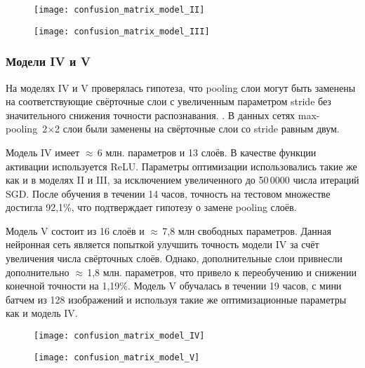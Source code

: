 \begin{figure}[H]
\centering
\begin{minipage}{.5\textwidth}
  \centering
  \texttt{[image: confusion\_matrix\_model\_II]}
  \vspace*{-1.7cm}
\end{minipage}%
\begin{minipage}{.5\textwidth}
  \centering
  \texttt{[image: confusion\_matrix\_model\_III]}
  \vspace*{-1.7cm}
\end{minipage}
\end{figure}

\subsubsection{Модели IV и V}
На моделях IV и V проверялась гипотеза, что pooling слои могут быть заменены на соответствующие свёрточные слои
с увеличенным параметром stride без значительного снижения точности распознавания. \cite{DBLP:journals/corr/SpringenbergDBR14}.
В данных сетях max-pooling~2$\times$2 слои были заменены  на свёрточные слои со stride равным двум.

Модель IV имеет $\approx$\,6 млн. параметров и 13 слоёв. В качестве функции активации используется ReLU.
Параметры оптимизации использовались такие же как и в моделях II и III, за исключением увеличенного
до 50\,0000 числа итераций SGD. После обучения в течении 14 часов, точность на тестовом множестве достигла 92,1\%, что
подтверждает гипотезу о замене pooling слоёв.

Модель V состоит из 16 слоёв и $\approx$\,7,8 млн свободных параметров. Данная нейронная сеть является попыткой
улучшить точность модели IV за счёт увеличения числа свёрточных слоёв. Однако, дополнительные слои привнесли
дополнительно $\approx$\,1,8 млн. параметров, что привело к переобучению и снижении конечной точности на 1,19\%.
Модель V обучалась в течении 19 часов, с мини батчем из 128 изображений и используя такие же оптимизационные параметры
как и модель IV.

\begin{figure}[H]
\centering
\begin{minipage}{.5\textwidth}
  \centering
  \texttt{[image: confusion\_matrix\_model\_IV]}
  \vspace*{-1.7cm}
\end{minipage}%
\begin{minipage}{.5\textwidth}
  \centering
  \texttt{[image: confusion\_matrix\_model\_V]}
  \vspace*{-1.7cm}
\end{minipage}
\end{figure}

